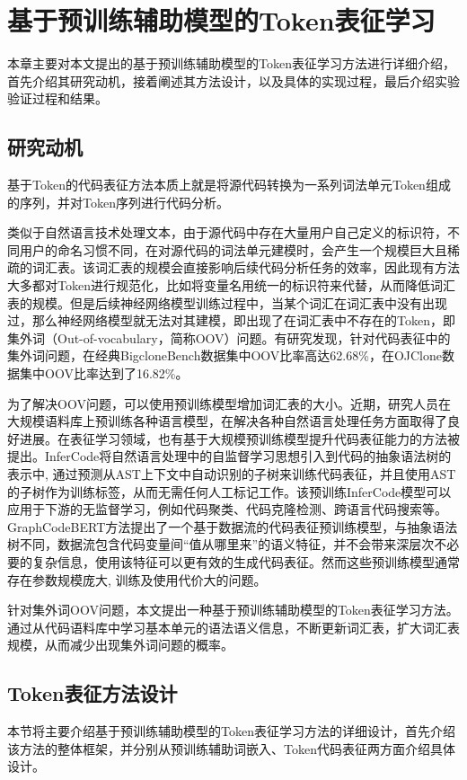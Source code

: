 \chapter{基于预训练辅助模型的Token表征学习}
\label{chap:Token}
本章主要对本文提出的基于预训练辅助模型的Token表征学习方法进行详细介绍，首先介绍其研究动机，接着阐述其方法设计，以及具体的实现过程，最后介绍实验验证过程和结果。

\section{研究动机}
\label{sec:TokenMotivation}

基于Token的代码表征方法本质上就是将源代码转换为一系列词法单元Token组成的序列，并对Token序列进行代码分析。

类似于自然语言技术处理文本，由于源代码中存在大量用户自己定义的标识符，不同用户的命名习惯不同，在对源代码的词法单元建模时，会产生一个规模巨大且稀疏的词汇表。该词汇表的规模会直接影响后续代码分析任务的效率，因此现有方法大多都对Token进行规范化，比如将变量名用统一的标识符来代替，从而降低词汇表的规模。但是后续神经网络模型训练过程中，当某个词汇在词汇表中没有出现过，那么神经网络模型就无法对其建模，即出现了在词汇表中不存在的Token，即集外词（Out-of-vocabulary，简称OOV）问题。有研究\cite{RJXB202205011}发现，针对代码表征中的集外词问题，在经典BigcloneBench\cite{7332459}数据集中OOV比率高达62.68\%，在OJClone数据集\cite{WOS:000485474201046}中OOV比率达到了16.82\%。

为了解决OOV问题，可以使用预训练模型增加词汇表的大小。近期，研究人员在大规模语料库上预训练各种语言模型，在解决各种自然语言处理任务方面取得了良好进展\cite{zhao2023survey}。在表征学习领域，也有基于大规模预训练模型提升代码表征能力的方法被提出。InferCode\cite{9402028}将自然语言处理中的自监督学习思想引入到代码的抽象语法树的表示中, 通过预测从AST上下文中自动识别的子树来训练代码表征，并且使用AST的子树作为训练标签，从而无需任何人工标记工作。该预训练InferCode模型可以应用于下游的无监督学习，例如代码聚类、代码克隆检测、跨语言代码搜索等。GraphCodeBERT\cite{guo2021graphcodebert}方法提出了一个基于数据流的代码表征预训练模型，与抽象语法树不同，数据流包含代码变量间“值从哪里来”的语义特征，并不会带来深层次不必要的复杂信息，使用该特征可以更有效的生成代码表征。然而这些预训练模型通常存在参数规模庞大, 训练及使用代价大的问题。

针对集外词OOV问题，本文提出一种基于预训练辅助模型的Token表征学习方法。通过从代码语料库中学习基本单元的语法语义信息，不断更新词汇表，扩大词汇表规模，从而减少出现集外词问题的概率。

\section{Token表征方法设计}
\label{sec:Token}
本节将主要介绍基于预训练辅助模型的Token表征学习方法的详细设计，首先介绍该方法的整体框架，并分别从预训练辅助词嵌入、Token代码表征两方面介绍具体设计。

